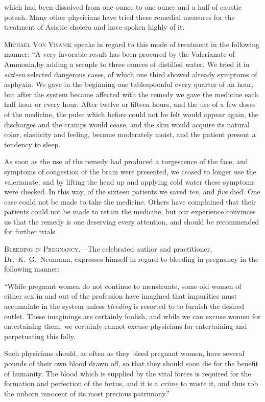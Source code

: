 which had been dissolved from one ounce to one ounce and a half of
caustic potash. Many other physicians have tried these remedial
measures for the treatment of Asiatic cholera and have spoken highly
of it.

\textsc{Michael Von Visanik} speaks in regard to this mode of treatment
in the following manner: ``A very favorable result has been procured
by the Valerianate of Ammonia,by adding a scruple to three ounces of
distilled water. We tried it in \emph{sixteen} selected dangerous cases, of
which one third showed already symptoms of asphyxia. We gave in
the beginning one tablespoonful every quarter of an hour, but after
the system became affected with the remedy we gave the medicine
each half hour or every hour. After twelve or fifteen hours, and the
use of a few doses of the medicine, the pulse which before could not
be felt would appear again, the discharges and the cramps would cease,
and the skin would acquire its natural color, elasticity and feeling,
become moderately moist, and the patient present a tendency to sleep.

As soon as the use of the remedy had produced a turgescence of the
face, and symptoms of congestion of the brain were presented, we
ceased to longer use the valerianate, and by lifting the head up and
applying cold water these symptoms were checked. In this way, of
the sixteen patients we saved \emph{ten}, and \emph{five} died. One case could not
be made to take the medicine. Others have complained that their
patients could not be made to retain the medicine, but our experience
convinces us that the remedy is one deserving every attention, and
should be recommended for further trials.

\textsc{Bleeding in Pregnancy}.---The celebrated author and practitioner,
Dr.\ K.\ G.\ Neumann, expresses himself in regard to bleeding in pregnancy
in the following manner:


``While pregnant women do not continue to menstruate, some old
women of either sex in and out of the profession have imagined that
impurities must accumulate in the system unless \emph{bleeding} is resorted to
to furnish the desired outlet. These imaginings are certainly foolish,
and while we can excuse women for entertaining them, we certainly
cannot excuse physicians for entertaining and perpetuating this folly.

Such physicians should, as often as they bleed pregnant women,
have several pounds of their own blood drawn off, so that they should
soon die for the benefit of humanity. The blood which is supplied by
the vital forces is required for the formation and perfection of the fœtus,
and it is a \emph{crime} to waste it, and thus rob the unborn innocent of its
most precious patrimony.''\endinput
